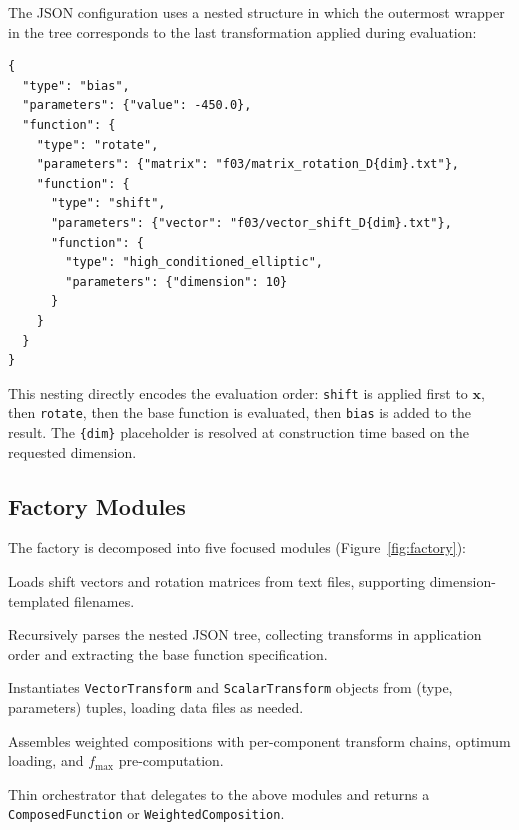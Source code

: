 \documentclass[11pt,a4paper]{article}
\begin{document}
The JSON configuration uses a nested structure in which the outermost wrapper
in the tree corresponds to the last transformation applied during evaluation:

\begin{lstlisting}[language={},caption={JSON configuration for CEC\,2005 F03 (Shifted Rotated High-Conditioned Elliptic).},label=lst:config]
{
  "type": "bias",
  "parameters": {"value": -450.0},
  "function": {
    "type": "rotate",
    "parameters": {"matrix": "f03/matrix_rotation_D{dim}.txt"},
    "function": {
      "type": "shift",
      "parameters": {"vector": "f03/vector_shift_D{dim}.txt"},
      "function": {
        "type": "high_conditioned_elliptic",
        "parameters": {"dimension": 10}
      }
    }
  }
}
\end{lstlisting}

This nesting directly encodes the evaluation order: \texttt{shift} is applied
first to $\mathbf{x}$, then \texttt{rotate}, then the base function is
evaluated, then \texttt{bias} is added to the result. The \texttt{\{dim\}}
placeholder is resolved at construction time based on the requested dimension.

\subsection{Factory Modules}

The factory is decomposed into five focused modules (Figure~\ref{fig:factory}):

\begin{description}[nosep,leftmargin=1em]
  \item[\texttt{DataLoader}] Loads shift vectors and rotation matrices from
    text files, supporting dimension-templated filenames.
  \item[\texttt{ConfigParser}] Recursively parses the nested JSON tree,
    collecting transforms in application order and extracting the base function
    specification.
  \item[\texttt{TransformBuilder}] Instantiates \texttt{VectorTransform} and
    \texttt{ScalarTransform} objects from (type, parameters) tuples, loading
    data files as needed.
  \item[\texttt{CompositionBuilder}] Assembles weighted compositions with
    per-component transform chains, optimum loading, and $f_{\max}$
    pre-computation.
  \item[\texttt{FunctionFactory}] Thin orchestrator that delegates to the above
    modules and returns a \texttt{ComposedFunction} or
    \texttt{WeightedComposition}.
\end{description}
\end{document}

